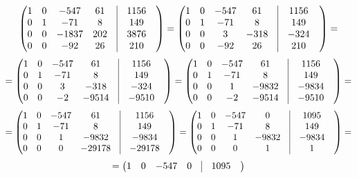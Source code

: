 \documentclass[a4paper,12pt]{article}
\begin{document}
\begin{enumerate}
\[\begin{pmatrix}
1 & 0 & -547 & 61 & \vrule &1156 & \\
0 & 1 & -71 & 8 & \vrule &149 & \\
0 & 0 & -1837 & 202 & \vrule &3876 & \\
0 & 0 & -92 & 26 & \vrule &210 & \\
\end{pmatrix}
=
\begin{pmatrix}
1 & 0 & -547 & 61 & \vrule &1156 & \\
0 & 1 & -71 & 8 & \vrule &149 & \\
0 & 0 & 3 & -318 & \vrule &-324 & \\
0 & 0 & -92 & 26 & \vrule &210 & \\
\end{pmatrix}
=
\]
\[
=
\begin{pmatrix}
1 & 0 & -547 & 61 & \vrule &1156 & \\
0 & 1 & -71 & 8 & \vrule &149 & \\
0 & 0 & 3 & -318 & \vrule &-324 & \\
0 & 0 & -2 & -9514 & \vrule &-9510 & \\
\end{pmatrix}
=
\begin{pmatrix}
1 & 0 & -547 & 61 & \vrule &1156 & \\
0 & 1 & -71 & 8 & \vrule &149 & \\
0 & 0 & 1 & -9832 & \vrule &-9834 & \\
0 & 0 & -2 & -9514 & \vrule &-9510 & \\
\end{pmatrix}
=
\]
\[
=
\begin{pmatrix}
1 & 0 & -547 & 61 & \vrule &1156 & \\
0 & 1 & -71 & 8 & \vrule &149 & \\
0 & 0 & 1 & -9832 & \vrule &-9834 & \\
0 & 0 & 0 & -29178 & \vrule &-29178 & \\
\end{pmatrix}
=
\begin{pmatrix}
1 & 0 & -547 & 0 & \vrule &1095 & \\
0 & 1 & -71 & 8 & \vrule &149 & \\
0 & 0 & 1 & -9832 & \vrule &-9834 & \\
0 & 0 & 0 & 1 & \vrule &1 & \\
\end{pmatrix}
=
\]
\[
=
\begin{pmatrix}
1 & 0 & -547 & 0 & \vrule &1095 & \\

\end{pmatrix}\]
\end{enumerate}
\end{document}
